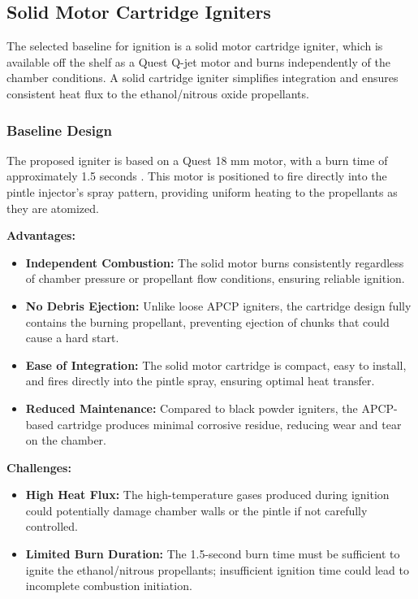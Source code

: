 \subsection{Solid Motor Cartridge Igniters}

The selected baseline for ignition is a solid motor cartridge igniter, which is available off the shelf as a Quest Q-jet motor and burns independently of the chamber conditions. A solid cartridge igniter simplifies integration and ensures consistent heat flux to the ethanol/nitrous oxide propellants.

\subsubsection{Baseline Design}

The proposed igniter is based on a Quest 18 mm motor, with a burn time of approximately 1.5 seconds \cite{aerotech_motor}. This motor is positioned to fire directly into the pintle injector's spray pattern, providing uniform heating to the propellants as they are atomized.

\textbf{Advantages:}
\begin{itemize}
    \item \textbf{Independent Combustion:} The solid motor burns consistently regardless of chamber pressure or propellant flow conditions, ensuring reliable ignition.
    \item \textbf{No Debris Ejection:} Unlike loose APCP igniters, the cartridge design fully contains the burning propellant, preventing ejection of chunks that could cause a hard start.
    \item \textbf{Ease of Integration:} The solid motor cartridge is compact, easy to install, and fires directly into the pintle spray, ensuring optimal heat transfer.
    \item \textbf{Reduced Maintenance:} Compared to black powder igniters, the APCP-based cartridge produces minimal corrosive residue, reducing wear and tear on the chamber.
\end{itemize}

\textbf{Challenges:}
\begin{itemize}
    \item \textbf{High Heat Flux:} The high-temperature gases produced during ignition could potentially damage chamber walls or the pintle if not carefully controlled.
    \item \textbf{Limited Burn Duration:} The 1.5-second burn time must be sufficient to ignite the ethanol/nitrous propellants; insufficient ignition time could lead to incomplete combustion initiation.
\end{itemize}



